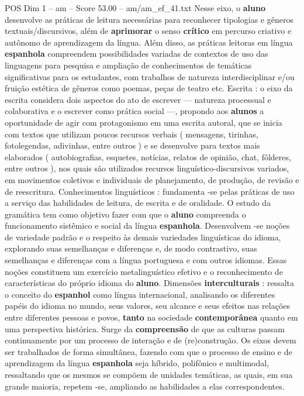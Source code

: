 \begin{textsample}{POS Dim 1 – am – Score 53.00 – am/am\_ef\_41.txt}
Nesse eixo, o \textbf{aluno} desenvolve as práticas de leitura necessárias para reconhecer tipologias e gêneros textuais/discursivos, além de \textbf{aprimorar} o senso \textbf{crítico} em percurso criativo e autônomo de aprendizagem da língua.
Além disso, as práticas leitoras em língua \textbf{espanhola} compreendem possibilidades variadas de contextos de uso das linguagens para pesquisa e ampliação de conhecimentos de temáticas significativas para os estudantes, com trabalhos de natureza interdisciplinar e/ou fruição estética de gêneros como poemas, peças de teatro etc.
Escrita : o eixo da escrita considera dois aspectos do ato de escrever — natureza processual e colaborativa e o escrever como prática social —, propondo aos \textbf{alunos} a oportunidade de agir com protagonismo em uma escrita autoral, que se inicia com textos que utilizam poucos recursos verbais ( mensagens, tirinhas, fotolegendas, adivinhas, entre outros ) e se desenvolve para textos mais elaborados ( autobiografias, esquetes, notícias, relatos de opinião, chat, fôlderes, entre outros ), nos quais são utilizados recursos linguístico-discursivos variados, em movimentos coletivos e individuais de planejamento, de produção, de revisão e de reescritura.
Conhecimentos linguísticos : fundamenta -se pelas práticas de uso a serviço das habilidades de leitura, de escrita e de oralidade.
O estudo da gramática tem como objetivo fazer com que o \textbf{aluno} compreenda o funcionamento sistêmico e social da língua \textbf{espanhola}.
Desenvolvem -se noções de variedade padrão e o respeito às demais variedades linguísticas do idioma, explorando suas semelhanças e diferenças e, de modo contrastivo, suas semelhanças e diferenças com a língua portuguesa e com outros idiomas.
Essas noções constituem um exercício metalinguístico efetivo e o reconhecimento de características do próprio idioma do \textbf{aluno}.
Dimensões \textbf{interculturais} : ressalta o conceito do \textbf{espanhol} como língua internacional, analisando os diferentes papéis do idioma no mundo, seus valores, seu alcance e seus efeitos nas relações entre diferentes pessoas e povos, \textbf{tanto} na sociedade \textbf{contemporânea} quanto em uma perspectiva histórica.
Surge da \textbf{compreensão} de que as culturas passam continuamente por um processo de interação e de (re)construção.
Os eixos devem ser trabalhados de forma simultânea, fazendo com que o processo de ensino e de aprendizagem da língua \textbf{espanhola} seja híbrido, polifônico e multimodal, ressaltando que os mesmos se compõem de unidades temáticas, as quais, em sua grande maioria, repetem -se, ampliando as habilidades a elas correspondentes.

\end{textsample}
